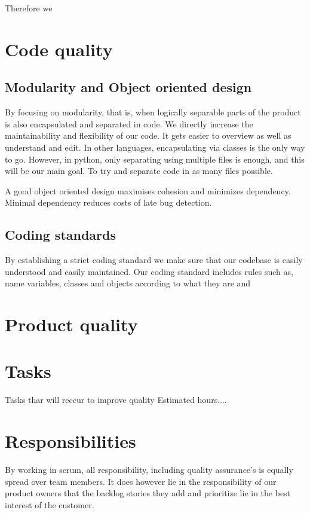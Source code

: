 \documentclass{article}
\begin{document}
Therefore we 

\section{Code quality}

\subsection{Modularity and Object oriented design}
By focusing on modularity, that is, when logically separable parts of the product is also encapsulated and separated in code.
We directly increase the maintainability and flexibility of our code.
It gets easier to overview as well as understand and edit. In other languages, encapsulating via classes is the only way to go. However, in python, only separating using multiple files is enough, and this will be our main goal. To try and separate code in as many files possible.

A good object oriented design maximises cohesion and minimizes dependency. Minimal dependency reduces costs of late bug detection.

\subsection{Coding standards}
By establishing a strict coding standard we make sure that our codebase is easily understood and easily maintained.
Our coding standard includes rules such as, name variables, classes and objects according to what they are and 


\section{Product quality}

\section{Tasks}
Tasks thar will reccur to improve quality
Estimated hours....
\section{Responsibilities}
By working in scrum, all responsibility, including quality assurance's is equally spread over team members.
It does however lie in the responsibility of our product owners that the backlog stories they add and prioritize lie in the best interest of the customer.
\end{document}

